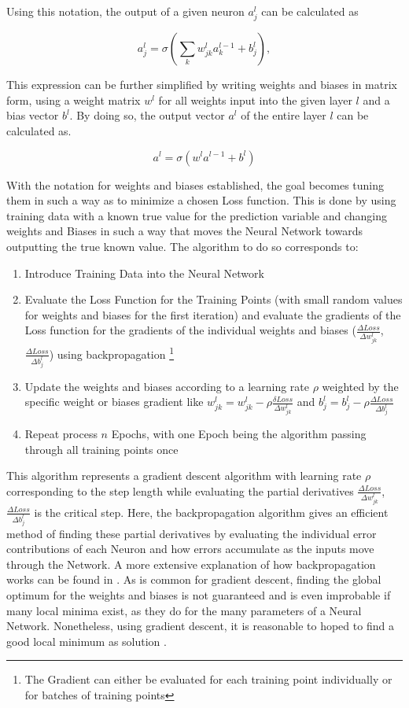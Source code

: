 \documentclass[preprint,12pt]{elsarticle}
\begin{document}
Using this notation, the output of a given neuron $a_j^l$ can be calculated as 

$$
a_j^l = \sigma\left( \sum_k w_{jk}^l a_k^{l-1} + b_j^l \right),
$$

This expression can be further simplified by writing weights and biases in matrix form, using a weight matrix $w^l$ for all weights input into the given layer $l$ and a bias vector $b^l$. By doing so, the output vector $a^l$ of the entire layer $l$ can be calculated as.

$$a^l = \sigma (w^la^{l-1}+b^l)$$

With the notation for weights and biases established, the goal becomes tuning them in such a way as to minimize a chosen Loss function. This is done by using training data with a known true value for the prediction variable and changing weights and Biases in such a way that moves the Neural Network towards outputting the true known value. 
The algorithm to do so corresponds to: 

\begin{enumerate}
	\item Introduce Training Data into the Neural Network
	\item Evaluate the Loss Function for the Training Points (with small random values for weights and biases for the first iteration) and evaluate the gradients of the Loss function for the gradients of the individual weights and biases ($\frac{\Delta Loss}{\Delta w_{jk}^l}$, $\frac{\Delta Loss}{\Delta b_j^l}$) using backpropagation  \footnote{The Gradient can either be evaluated for each training point individually or for batches of training points}
	\item Update the weights and biases according to a learning rate $\rho$ weighted by the specific weight or biases gradient like $w_{jk}^l =w_{jk}^l - \rho \frac{\delta Loss}{\Delta w_{jk}^l}$ and $b_j^l =b_j^l - \rho \frac{\Delta Loss}{\Delta b_j^l}$ 
	\item Repeat process $n$ Epochs, with one Epoch being the algorithm passing through all training points once
\end{enumerate}

This algorithm represents a gradient descent algorithm with learning rate  $\rho$ corresponding to the step length while evaluating the partial derivatives $\frac{\Delta Loss}{\Delta w_{jk}^l}$, $\frac{\Delta Loss}{\Delta b_j^l}$ is the critical step. Here, the backpropagation algorithm gives an efficient method of finding these partial derivatives by evaluating the individual error contributions of each Neuron and how errors accumulate as the inputs move through the Network. A more extensive explanation of how backpropagation works can be found in \cite{nielsen2015neuralChap2}. As is common for gradient descent, finding the global optimum for the weights and biases is not guaranteed and is even improbable if many local minima exist, as they do for the many parameters of a Neural Network. Nonetheless, using gradient descent, it is reasonable to hoped to find a good local minimum as solution \cite{James2023} \cite{nielsen2015neuralChap2}.
\end{document}
